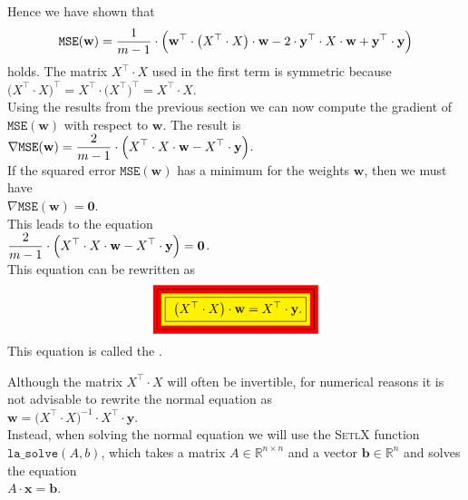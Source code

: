 Hence we have shown that
\begin{equation}
  \label{eq:squared-error-4}
  \mathtt{MSE}(\mathbf{w}) = \displaystyle \frac{1}{m-1} \cdot \Bigl(\mathbf{w}^\top \cdot \bigl(X^\top \cdot X\bigr) \cdot \mathbf{w} 
                                             - 2 \cdot \textbf{y}^\top \cdot X \cdot \mathbf{w} 
                                             + \mathbf{y}^\top \cdot \mathbf{y}
                                        \Bigr)
\end{equation}
holds.  The matrix $X^\top \cdot X$ used in the first term is symmetric because
\\[0.2cm]
\hspace*{1.3cm}
$\bigl(X^\top \cdot X\bigr)^\top = X^\top \cdot \bigl(X^\top\bigr)^\top = X^\top \cdot X$.
\\[0.2cm]
Using the results from the previous section we can now compute the gradient of $\mathtt{MSE}(\mathbf{w})$ with respect to
$\mathbf{w}$.  The result is
\\[0.2cm]
\hspace*{1.3cm}
$\displaystyle \nabla \mathtt{MSE}(\mathbf{w}) = \frac{2}{m-1} \cdot \Bigl(X^\top \cdot X \cdot \mathbf{w} - X^\top \cdot \mathbf{y}\Bigr)$.
\\[0.2cm]
If the squared error $\mathtt{MSE}(\mathbf{w})$ has a minimum for the weights $\mathbf{w}$, then we must have
\\[0.2cm]
\hspace*{1.3cm}
$\nabla \mathtt{MSE}(\mathbf{w}) = \mathbf{0}$.
\\[0.2cm]
This leads to the equation
\\[0.2cm]
\hspace*{1.3cm}
$\displaystyle\frac{2}{m-1} \cdot \Bigl(X^\top \cdot X \cdot \mathbf{w} - X^\top \cdot \mathbf{y}\Bigr) = \mathbf{0}$.
\\[0.2cm]
This equation can be rewritten as
\begin{equation}
  \label{eq:normal-equation}
 \colorbox{red}{\framebox{\colorbox{yellow}{\framebox{
 $\ds\bigl(X^\top \cdot X\bigr) \cdot \mathbf{w} = X^\top \cdot \mathbf{y}$.}}}} 
\end{equation}
This equation is called the .  

\remark
Although the matrix $X^\top \cdot X$ will often be invertible, for numerical reasons it is not
advisable to rewrite the normal equation as
\\[0.2cm]
\hspace*{1.3cm}
$\mathbf{w} = \bigl(X^\top \cdot X)^{-1} \cdot X^\top \cdot \mathbf{y}$.
\\[0.2cm]
Instead, when solving the normal equation we will use the \textsc{SetlX} function $\mathtt{la\_solve}(A,b)$, which
takes a matrix $A \in \mathbb{R}^{n \times n}$ and a vector $\mathbf{b} \in \mathbb{R}^n$ and solves the equation
\\[0.2cm]
\hspace*{1.3cm}
$A \cdot \mathbf{x} = \mathbf{b}$.  \eox


